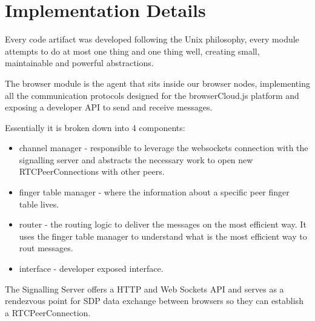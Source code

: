 
\section{Implementation Details}

Every code artifact was developed following the Unix philosophy, every module attempts to do at most one thing and one thing well, creating small, maintainable and powerful abstractions.


The browser module is the agent that sits inside our browser nodes, implementing all the communication protocols designed for the browserCloud.js platform and exposing a developer API to send and receive messages.

Essentially it is broken down into 4 components:

\begin{itemize}
    \item channel manager - responsible to leverage the websockets connection with the signalling server and abstracts the necessary work to open new RTCPeerConnections with other peers.
    \item finger table manager - where the information about a specific peer finger table lives.
    \item router - the routing logic to deliver the messages on the most efficient way. It uses the finger table manager to understand what is the most efficient way to rout messages.
    \item interface - developer exposed interface.
\end{itemize}


The Signalling Server offers a HTTP and Web Sockets API and serves as a rendezvous point for SDP data exchange between browsers so they can establish a RTCPeerConnection. 


